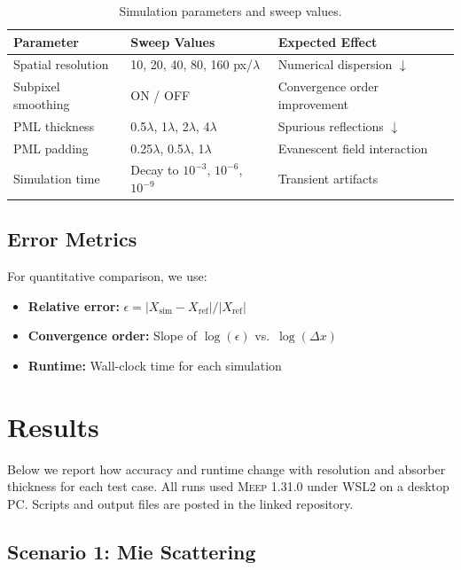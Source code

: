 \documentclass[12pt, a4paper]{article}
\newcommand{\meep}{\textsc{Meep}}
\newcommand{\pml}{\textsc{PML}}
\begin{document}
\begin{table}[H]
\centering
\caption{Simulation parameters and sweep values.}
\label{tab:parameters}
\begin{tabular}{lll}
\toprule
\textbf{Parameter} & \textbf{Sweep Values} & \textbf{Expected Effect} \\
\midrule
Spatial resolution & 10, 20, 40, 80, 160 px/$\lambda$ & Numerical dispersion $\downarrow$ \\
Subpixel smoothing & ON / OFF & Convergence order improvement \\
\pml{} thickness & 0.5$\lambda$, 1$\lambda$, 2$\lambda$, 4$\lambda$ & Spurious reflections $\downarrow$ \\
\pml{} padding & 0.25$\lambda$, 0.5$\lambda$, 1$\lambda$ & Evanescent field interaction \\
Simulation time & Decay to $10^{-3}$, $10^{-6}$, $10^{-9}$ & Transient artifacts \\
\bottomrule
\end{tabular}
\end{table}

\subsection{Error Metrics}

For quantitative comparison, we use:
\begin{itemize}
    \item \textbf{Relative error:} $\epsilon = |X_\text{sim} - X_\text{ref}| / |X_\text{ref}|$
    \item \textbf{Convergence order:} Slope of $\log(\epsilon)$ vs.\ $\log(\Delta x)$
    \item \textbf{Runtime:} Wall-clock time for each simulation
\end{itemize}


\section{Results}
\label{sec:results}

Below we report how accuracy and runtime change with resolution and absorber thickness for each test case. All runs used \meep{} 1.31.0 under WSL2 on a desktop PC. Scripts and output files are posted in the linked repository.

\subsection{Scenario 1: Mie Scattering}
\end{document}
